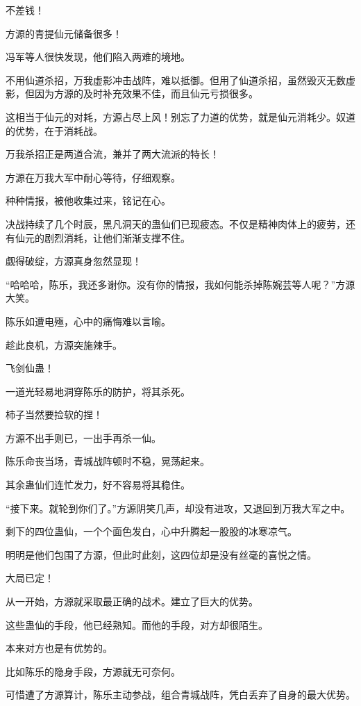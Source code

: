 \begin{this_body}
不差钱！

方源的青提仙元储备很多！

冯军等人很快发现，他们陷入两难的境地。

不用仙道杀招，万我虚影冲击战阵，难以抵御。但用了仙道杀招，虽然毁灭无数虚影，但因为方源的及时补充效果不佳，而且仙元亏损很多。

这相当于仙元的对耗，方源占尽上风！别忘了力道的优势，就是仙元消耗少。奴道的优势，在于消耗战。

万我杀招正是两道合流，兼并了两大流派的特长！

方源在万我大军中耐心等待，仔细观察。

种种情报，被他收集过来，铭记在心。

决战持续了几个时辰，黑凡洞天的蛊仙们已现疲态。不仅是精神肉体上的疲劳，还有仙元的剧烈消耗，让他们渐渐支撑不住。

觑得破绽，方源真身忽然显现！

“哈哈哈，陈乐，我还多谢你。没有你的情报，我如何能杀掉陈婉芸等人呢？”方源大笑。

陈乐如遭电殛，心中的痛悔难以言喻。

趁此良机，方源突施辣手。

飞剑仙蛊！

一道光轻易地洞穿陈乐的防护，将其杀死。

柿子当然要捡软的捏！

方源不出手则已，一出手再杀一仙。

陈乐命丧当场，青城战阵顿时不稳，晃荡起来。

其余蛊仙们连忙发力，好不容易将其稳住。

“接下来。就轮到你们了。”方源阴笑几声，却没有进攻，又退回到万我大军之中。

剩下的四位蛊仙，一个个面色发白，心中升腾起一股股的冰寒凉气。

明明是他们包围了方源，但此时此刻，这四位却是没有丝毫的喜悦之情。

大局已定！

从一开始，方源就采取最正确的战术。建立了巨大的优势。

这些蛊仙的手段，他已经熟知。而他的手段，对方却很陌生。

本来对方也是有优势的。

比如陈乐的隐身手段，方源就无可奈何。

可惜遭了方源算计，陈乐主动参战，组合青城战阵，凭白丢弃了自身的最大优势。


\end{this_body}
